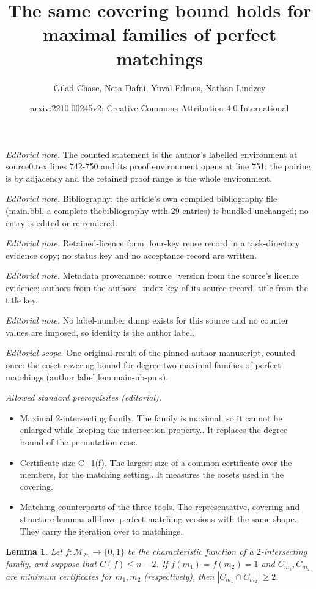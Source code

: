 \documentclass[10pt,a4paper]{article}
\title{The same covering bound holds for maximal families of perfect matchings}
\author{Gilad Chase, Neta Dafni, Yuval Filmus, Nathan Lindzey}
\date{arxiv:2210.00245v2; Creative Commons Attribution 4.0 International}
\newtheorem{lemma}[theorem]{Lemma}
\theoremstyle{definition}
\providecommand{\cM}{\mathcal{M}}
\begin{document}
\maketitle
\noindent\textit{Editorial note.} The counted statement is the author's labelled environment at source0.tex lines 742-750 and its proof environment opens at line 751; the pairing is by adjacency and the retained proof range is the whole environment.\par\medskip
\noindent\textit{Editorial note.} Bibliography: the article's own compiled bibliography file (main.bbl, a complete thebibliography with 29 entries) is bundled unchanged; no entry is edited or re-rendered.\par\medskip
\noindent\textit{Editorial note.} Retained-licence form: four-key reuse record in a task-directory evidence copy; no status key and no acceptance record are written.\par\medskip
\noindent\textit{Editorial note.} Metadata provenance: source\_version from the source's licence evidence; authors from the authors\_index key of its source record, title from the title key.\par\medskip
\noindent\textit{Editorial note.} No label-number dump exists for this source and no counter values are imposed, so identity is the author label.\par\medskip
\noindent\textit{Editorial scope.} One original result of the pinned author manuscript, counted once: the coset covering bound for degree-two maximal families of perfect matchings (author label lem:main-ub-pms).\par\medskip
\noindent\textit{Allowed standard prerequisites (editorial).}\begin{itemize}
\item Maximal 2-intersecting family. The family is maximal, so it cannot be enlarged while keeping the intersection property.. It replaces the degree bound of the permutation case.
\item Certificate size C\_1(f). The largest size of a common certificate over the members, for the matching setting.. It measures the cosets used in the covering.
\item Matching counterparts of the three tools. The representative, covering and structure lemmas all have perfect-matching versions with the same shape.. They carry the iteration over to matchings.
\end{itemize}\medskip
\begin{lemma} \label{lem:2-int-coset-pms}
Let $f\colon \cM_{2n} \to \{0,1\}$ be the characteristic function of a $2$-intersecting family, and suppose that $C(f) \leq n-2$. If $f(m_1) = f(m_2) = 1$ and $C_{m_1},C_{m_2}$ are minimum certificates for $m_1,m_2$ (respectively), then $|C_{m_1} \cap C_{m_2}| \geq 2$.
\end{lemma}
\end{document}
